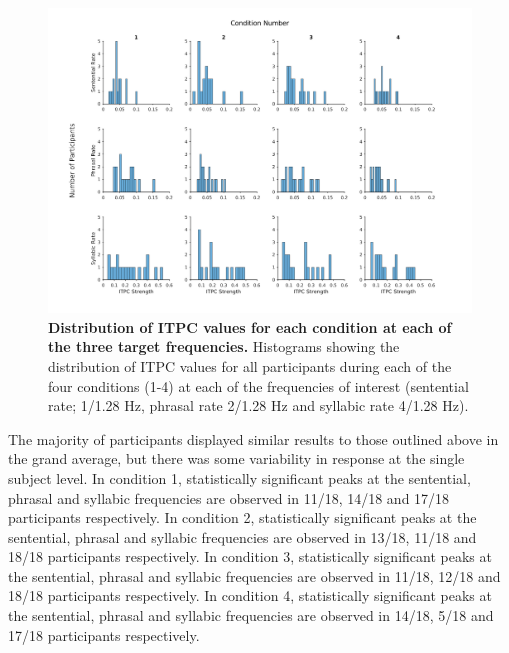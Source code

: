 \documentclass[a4paper,10pt,twoside]{article}
\begin{document}

\begin{figure}[tbhp]
\includegraphics[width=\linewidth]{ITPC_Distributions.png}
\caption{\textbf{Distribution of ITPC values for each condition at each of the three target frequencies.} Histograms showing the distribution of ITPC values for all participants during each of the four conditions (1-4) at each of the frequencies of interest (sentential rate; 1/1.28 Hz, phrasal rate 2/1.28 Hz and syllabic rate 4/1.28 Hz).}
\label{ITPC_Distribution}
\end{figure}

The majority of participants displayed similar results to those outlined above in the grand average, but there was some variability in response at the single subject level. In condition 1, statistically significant peaks at the sentential, phrasal and syllabic frequencies are observed in 11/18,
14/18 and 17/18 participants respectively. In
condition 2, statistically significant peaks at the sentential,
phrasal and syllabic frequencies are observed in 13/18, 11/18 and
18/18 participants respectively. In condition 3,
statistically significant peaks at the sentential, phrasal and
syllabic frequencies are observed in 11/18, 12/18 and 18/18
participants respectively. In condition 4,
statistically significant peaks at the sentential, phrasal and
syllabic frequencies are observed in 14/18, 5/18 and 17/18
participants respectively.
\end{document}
